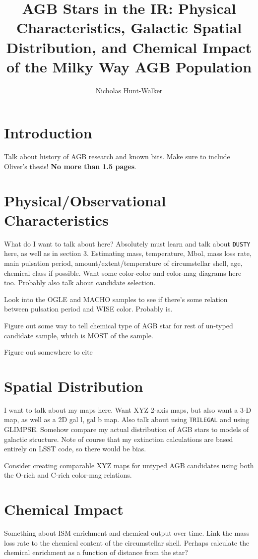 \title{AGB Stars in the IR: Physical Characteristics, Galactic Spatial Distribution, and Chemical Impact of the Milky Way AGB Population}
\author{Nicholas Hunt-Walker}
\maketitle

\section{Introduction}
Talk about history of AGB research and known bits. Make sure to include Oliver's thesis! \textbf{No more than 1.5 pages}.

\section{Physical/Observational Characteristics}
What do I want to talk about here? Absolutely must learn and talk about {\tt DUSTY} here, as well as in section 3.  Estimating mass, temperature, Mbol, mass loss rate, main pulsation period, amount/extent/temperature of circumstellar shell, age, chemical class if possible.  Want some color-color and color-mag diagrams here too.  Probably also talk about candidate selection.

Look into the OGLE and MACHO samples to see if there's some relation between pulsation period and WISE color.  Probably is.

Figure out some way to tell chemical type of AGB star for rest of un-typed candidate sample, which is MOST of the sample.

Figure out somewhere to cite \citep{1983ARA&A..21..271I}

\section{Spatial Distribution}
I want to talk about my maps here.  Want XYZ 2-axis maps, but also want a 3-D map, as well as a 2D gal l, gal b map.  Also talk about using {\tt TRILEGAL} and using GLIMPSE. Somehow compare my actual distribution of AGB stars to models of galactic structure.  Note of course that my extinction calculations are based entirely on LSST code, so there would be bias.

Consider creating comparable XYZ maps for untyped AGB candidates using both the O-rich and C-rich color-mag relations.

\section{Chemical Impact}
Something about ISM enrichment and chemical output over time. Link the mass loss rate to the chemical content of the circumstellar shell.  Perhaps calculate the chemical enrichment as a function of distance from the star?

